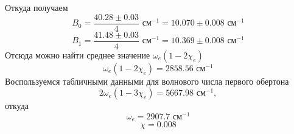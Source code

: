 \noindent Откуда получаем
\begin{equation}
B_0 = \dfrac{40.28 \pm 0.03}{4} \text{ см}^{-1} = 10.070 \pm 0.008 \text{ см$^{-1}$}
\end{equation}
\begin{equation}
B_1 = \dfrac{41.48 \pm 0.03}{4} \text{ см}^{-1} = 10.369 \pm 0.008 \text{ см$^{-1}$}
\end{equation}
Отсюда можно найти среднее значение $\omega_e(1-2\chi_e)$
\begin{equation}
\omega_e(1-2\chi_e) = 
2858.56
\text{ см$^{-1}$}
\end{equation}
Воспользуемся табличными данными для волнового числа первого обертона $$2\omega_e(1-3\chi_e) = 5667.98 \text{ см$^{-1}$},$$ откуда
\begin{equation}
\omega_e = 
2907.7
 \text{ см$^{-1}$}
\end{equation}
\begin{equation}
\chi = 
0.008
\end{equation}

